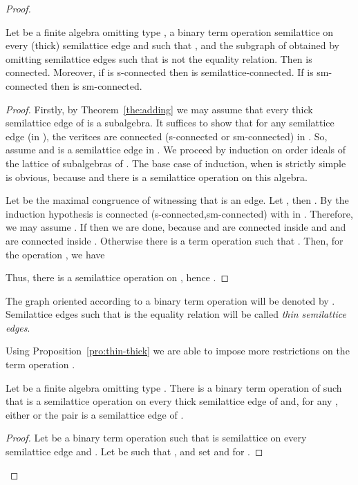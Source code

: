 \documentclass[11pt]{article}
\begin{document}
\begin{proof}
\begin{prop}\label{pro:thin-thick}
Let  be a finite algebra omitting type \one,  a binary term operation 
semilattice on every (thick) semilattice edge and such that , 
and  the subgraph of  obtained by omitting semilattice 
edges  such that  is not the equality relation. Then  
is connected. Moreover, if  is s-connected then  
is semilattice-connected. If  is sm-connected then  is
sm-connected. 
\end{prop}

\begin{proof}
Firstly, by Theorem~\ref{the:adding} we may assume that every thick
semilattice edge of  is a subalgebra.
It suffices to show that for any semilattice edge  (in ),
the veritces  are connected (s-connected or sm-connected) in .
So, assume  and  is a semilattice edge in .
We proceed by induction on order ideals of the lattice  of subalgebras 
of . The base case 
of induction, when  is strictly simple is obvious,
because  and there is a semilattice operation on
this algebra.

Let  be the maximal congruence of  witnessing that 
 is an edge. Let , then . By the induction
hypothesis  is connected (s-connected,sm-connected) with  in
. Therefore, we may assume . If 
 then we are done, because  and
 are connected inside  and  and  are
connected inside . Otherwise there is a term operation 
 such that . Then, for the operation
, we have

Thus, there is a semilattice operation on , hence
. 
\end{proof}

The graph  oriented according to a binary term operation  will be
denoted by . Semilattice edges  such that  is
the equality relation will be called \emph{thin semilattice edges}.

Using Proposition~\ref{pro:thin-thick} we are able to impose more
restrictions on the term operation .
\begin{prop}\label{pro:good-operation}
Let  be a finite algebra omitting type \one. There is a binary
term operation  of  such that  is a semilattice operation on
every thick semilattice edge of  and, for any , either
 or the pair  is a semilattice edge of .
\end{prop}

\begin{proof}
Let  be a binary term operation such that  is semilattice on every 
semilattice edge and . Let  be such that
, and set  and 
for .

\medskip


\end{proof}
\end{proof}
\end{document}
